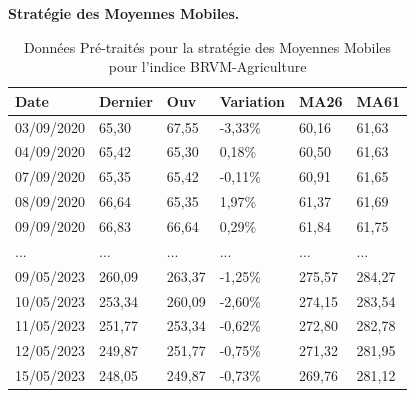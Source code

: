 \textbf{Stratégie des Moyennes Mobiles.}
\begin{samepage}
\begin{table}[ht]
\centering
\caption{Données Pré-traités pour la stratégie des Moyennes Mobiles pour l'indice BRVM-Agriculture}\label{tab:multirow}
\begin{tabular}{p{2cm}p{2cm}p{2cm}p{2cm}p{2cm}p{1.5cm}}
	\hline
	Date 		&Dernier &Ouv 	&Variation	&MA26 		& MA61	\\ 
	\hline                                                                  
	03/09/2020	&65,30	&67,55	&-3,33\%	&60,16	&61,63  \\ 
	04/09/2020	&65,42	&65,30	&0,18\%		&60,50	&61,63  \\ 
	07/09/2020	&65,35	&65,42	&-0,11\%	&60,91	&61,65  \\ 
	08/09/2020	&66,64	&65,35	&1,97\%		&61,37	&61,69  \\ 
	09/09/2020	&66,83	&66,64	&0,29\%		&61,84	&61,75  \\
	...			&...	&	...	&	...		&...		&... \\ 
	09/05/2023	&260,09	&263,37	&-1,25\%	&275,57	&284,27   \\
	10/05/2023	&253,34	&260,09	&-2,60\%	&274,15	&283,54   \\
	11/05/2023	&251,77	&253,34	&-0,62\%	&272,80	&282,78   \\
	12/05/2023	&249,87	&251,77	&-0,75\%	&271,32	&281,95   \\
	15/05/2023	&248,05	&249,87	&-0,73\%	&269,76	&281,12 \\
	\hline
\end{tabular}
\end{table}%


\end{samepage}
